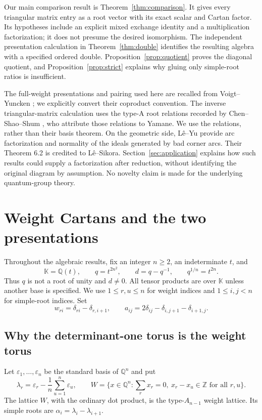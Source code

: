 \documentclass[11pt]{article}
\theoremstyle{definition}
\theoremstyle{remark}
\newcommand{\kk}{\mathbb{K}}
\newcommand{\Z}{\mathbb{Z}}
\newcommand{\Q}{\mathbb{Q}}
\newcommand{\eps}{\varepsilon}
\begin{document}
Our main comparison result is Theorem~\ref{thm:comparison}. It gives every triangular matrix entry as a root vector with its exact scalar and Cartan factor. Its hypotheses include an explicit mixed exchange identity and a multiplication factorization; it does not presume the desired isomorphism. The independent presentation calculation in Theorem~\ref{thm:double} identifies the resulting algebra with a specified ordered double. Proposition~\ref{prop:quotient} proves the diagonal quotient, and Proposition~\ref{prop:strict} explains why gluing only simple-root ratios is insufficient.

The full-weight presentations and pairing used here are recalled from Voigt--Yuncken \cite[Definition 2.13, Proposition 2.14, and Section 2.8.1]{VY}; we explicitly convert their coproduct convention. The inverse triangular-matrix calculation uses the type-A root relations recorded by Chen--Shao--Shum \cite[Section 3]{CSS}, who attribute those relations to Yamane.  We use the relations, rather than their basis theorem. On the geometric side, L\^e--Yu \cite[Theorems 6.2 and 7.2]{LY} provide arc factorization and normality of the ideals generated by bad corner arcs. Their Theorem 6.2 is credited to L\^e--Sikora. Section~\ref{sec:application} explains how such results could supply a factorization after reduction, without identifying the original diagram by assumption. No novelty claim is made for the underlying quantum-group theory.

\section{Weight Cartans and the two presentations}\label{sec:presentations}

Throughout the algebraic results, fix an integer $n\geq2$, an indeterminate $t$, and
\begin{equation}\label{eq:base}
 \kk=\Q(t),\qquad q=t^{2n^2},\qquad d=q-q^{-1},\qquad q^{1/n}=t^{2n}.
\end{equation}
Thus $q$ is not a root of unity and $d\ne0$. All tensor products are over $\kk$ unless another base is specified. We use $1\leq r,u\leq n$ for weight indices and $1\leq i,j<n$ for simple-root indices. Set
\[
 w_{ri}=\delta_{ri}-\delta_{r,i+1},\qquad
 a_{ij}=2\delta_{ij}-\delta_{i,j+1}-\delta_{i+1,j}.
\]

\subsection{Why the determinant-one torus is the weight torus}
Let $\eps_1,\ldots,\eps_n$ be the standard basis of $\Q^n$ and put
\[
 \lambda_r=\eps_r-\frac1n\sum_{u=1}^n\eps_u,\qquad
 W=\{x\in\Q^n:\textstyle\sum_r x_r=0,\ x_r-x_u\in\Z\text{ for all }r,u\}.
\]
The lattice $W$, with the ordinary dot product, is the type-$A_{n-1}$ weight lattice. Its simple roots are $\alpha_i=\lambda_i-\lambda_{i+1}$.
\end{document}
